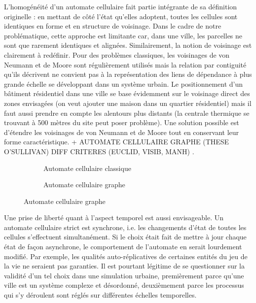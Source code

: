\documentclass[10pt]{article}
\begin{document}
L'homogénéité d'un automate cellulaire fait partie intégrante de sa
définition originelle : en mettant de côté l'état qu'elles adoptent,
toutes les cellules sont identiques en forme et en structure de
voisinage. Dans le cadre de notre problématique, cette approche est
limitante car, dans une ville, les parcelles ne sont que rarement
identiques et alignées. Similairement, la notion de voisinage est
clairement à redéfinir. Pour des problèmes classiques, les voisinages
de von Neumann et de Moore sont régulièrement utilisés mais la
relation par contiguité qu'ils décrivent ne convient pas à la
représentation des liens de dépendance à plus grande échelle se
développant dans un système urbain. Le positionnement d'un bâtiment
résidentiel dans une ville se base évidemment sur le voisinage direct
des zones envisagées (on veut ajouter une maison dans un quartier
résidentiel) mais il faut aussi prendre en compte les alentours plus
distants (la centrale thermique se trouvant à 500 mètres du site peut
poser problème). Une solution possible est d'étendre les voisinages de
von Neumann et de Moore tout en conservant leur forme
caractéristique. + AUTOMATE CELLULAIRE GRAPHE (THESE O'SULLIVAN) DIFF
CRITERES (EUCLID, VISIB, MANH)
\cite{O'Sullivan2000,0'Sullivan2001}.

\begin{figure}
  \begin{subfigure}[b]{.5\linewidth}
    \centering
    
    \caption{Automate cellulaire classique}
  \end{subfigure}
  \begin{subfigure}[b]{.5\linewidth}
    \centering
    
    \caption{Automate cellulaire graphe}
  \end{subfigure}
\end{figure}

Une prise de liberté quant à l'aspect temporel est aussi
envisageable. Un automate cellulaire strict est synchrone, i.e. les
changements d'état de toutes les cellules s'effectuent
simultanément. Si le choix était fait de mettre à jour chaque état de
façon asynchrone, le comportement de l'automate en serait lourdement
modifié. Par exemple, les qualités auto-réplicatives de certaines
entités du jeu de la vie ne seraient pas garanties. Il est pourtant
légitime de se questionner sur la validité d'un tel choix dans une
simulation urbaine, premièrement parce qu'une ville est un système
complexe et désordonné, deuxièmement parce les processus qui s'y
déroulent sont réglés sur différentes échelles temporelles.
\end{document}
